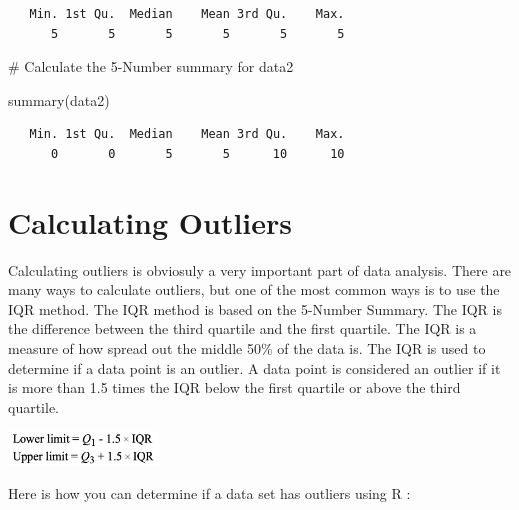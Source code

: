 \documentclass[
  letterpaper,
  DIV=11,
  numbers=noendperiod]{scrreprt}
\newenvironment{Shaded}{\begin{snugshade}}{\end{snugshade}}
\newcommand{\CommentTok}[1]{\textcolor[rgb]{0.37,0.37,0.37}{#1}}
\newcommand{\FunctionTok}[1]{\textcolor[rgb]{0.28,0.35,0.67}{#1}}
\newcommand{\NormalTok}[1]{\textcolor[rgb]{0.00,0.23,0.31}{#1}}
\begin{document}
\begin{verbatim}
   Min. 1st Qu.  Median    Mean 3rd Qu.    Max. 
      5       5       5       5       5       5 
\end{verbatim}

\begin{Shaded}
\begin{Highlighting}[]
\CommentTok{\# Calculate the 5{-}Number summary for data2}

\FunctionTok{summary}\NormalTok{(data2)}
\end{Highlighting}
\end{Shaded}

\begin{verbatim}
   Min. 1st Qu.  Median    Mean 3rd Qu.    Max. 
      0       0       5       5      10      10 
\end{verbatim}

\section*{Calculating Outliers}\label{calculating-outliers}


Calculating outliers is obviosuly a very important part of data
analysis. There are many ways to calculate outliers, but one of the most
common ways is to use the IQR method. The IQR method is based on the
5-Number Summary. The IQR is the difference between the third quartile
and the first quartile. The IQR is a measure of how spread out the
middle 50\% of the data is. The IQR is used to determine if a data point
is an outlier. A data point is considered an outlier if it is more than
1.5 times the IQR below the first quartile or above the third quartile.

\includegraphics[width=0.3\textwidth,height=\textheight]{./images/MOV-2.jpg}

Here is how you can determine if a data set has outliers using R :
\end{document}
